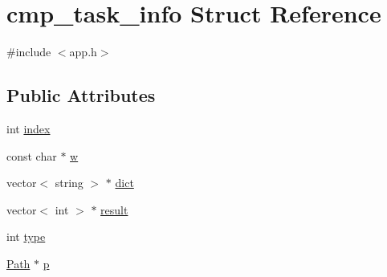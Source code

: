 \hypertarget{structcmp__task__info}{\section{cmp\+\_\+task\+\_\+info Struct Reference}
\label{structcmp__task__info}
}


{\ttfamily \#include $<$app.\+h$>$}

\subsection*{Public Attributes}
\begin{DoxyCompactItemize}
\item 
int \hyperlink{structcmp__task__info_a3633d922d3eef29d9ebb03ca51010b8f}{index}
\item 
const char $\ast$ \hyperlink{structcmp__task__info_a4539e63c72404966130c3129cd71aa8d}{w}
\item 
vector$<$ string $>$ $\ast$ \hyperlink{structcmp__task__info_ae886fd2b9fa914fd8937ff6aea779234}{dict}
\item 
vector$<$ int $>$ $\ast$ \hyperlink{structcmp__task__info_acf3590e23bc8a1c548ffa74a7c5d794c}{result}
\item 
int \hyperlink{structcmp__task__info_a96314bf00c0c73e503a81ecdcd6502be}{type}
\item 
\hyperlink{struct_path}{Path} $\ast$ \hyperlink{structcmp__task__info_ad0c6b8c7f0797b2043dba88d679d8f2f}{p}
\end{DoxyCompactItemize}


